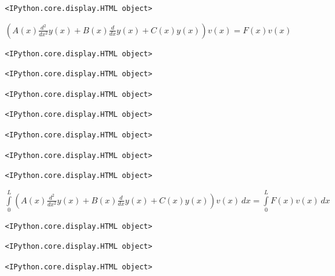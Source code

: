 \documentclass[
  11pt,
  a4paper,
]{scrbook}
\begin{document}
\begin{verbatim}
<IPython.core.display.HTML object>
\end{verbatim}

$\displaystyle \left(A{\left(x \right)} \frac{d^{2}}{d x^{2}} y{\left(x \right)} + B{\left(x \right)} \frac{d}{d x} y{\left(x \right)} + C{\left(x \right)} y{\left(x \right)}\right) v{\left(x \right)} = F{\left(x \right)} v{\left(x \right)}$

\begin{verbatim}
<IPython.core.display.HTML object>
\end{verbatim}

\begin{verbatim}
<IPython.core.display.HTML object>
\end{verbatim}

\begin{verbatim}
<IPython.core.display.HTML object>
\end{verbatim}

\begin{verbatim}
<IPython.core.display.HTML object>
\end{verbatim}

\begin{verbatim}
<IPython.core.display.HTML object>
\end{verbatim}

\begin{verbatim}
<IPython.core.display.HTML object>
\end{verbatim}

\begin{verbatim}
<IPython.core.display.HTML object>
\end{verbatim}

$\displaystyle \int\limits_{0}^{L} \left(A{\left(x \right)} \frac{d^{2}}{d x^{2}} y{\left(x \right)} + B{\left(x \right)} \frac{d}{d x} y{\left(x \right)} + C{\left(x \right)} y{\left(x \right)}\right) v{\left(x \right)}\, dx = \int\limits_{0}^{L} F{\left(x \right)} v{\left(x \right)}\, dx$

\begin{verbatim}
<IPython.core.display.HTML object>
\end{verbatim}

\begin{verbatim}
<IPython.core.display.HTML object>
\end{verbatim}

\begin{verbatim}
<IPython.core.display.HTML object>
\end{verbatim}
\end{document}
